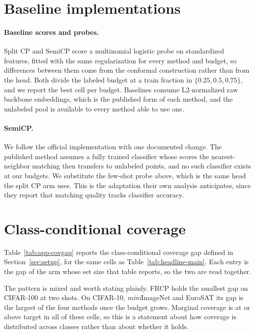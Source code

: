 \section{Baseline implementations}
\label{app:baselines}

\paragraph{Baseline scores and probes.} Split CP and SemiCP score a
multinomial logistic probe on standardized features, fitted with the
same regularization for every method and budget, so differences between
them come from the conformal construction rather than from the head.
Both divide the labeled budget at a train fraction in
$\{0.25, 0.5, 0.75\}$, and we report the best cell per budget.
Baselines consume L2-normalized raw backbone embeddings, which is the
published form of each method, and the unlabeled pool is available to
every method able to use one.

\paragraph{SemiCP.} We follow the official implementation with one
documented change. The published method assumes a fully trained
classifier whose scores the nearest-neighbor matching then transfers to
unlabeled points, and no such classifier exists at our budgets. We
substitute the few-shot probe above, which is the same head the split
CP arm uses. This is the adaptation their own analysis anticipates,
since they report that matching quality tracks classifier accuracy.

\section{Class-conditional coverage}
\label{app:covgap}

Table~\ref{tab:app-covgap} reports the class-conditional coverage gap
defined in Section~\ref{sec:setup}, for the same cells as
Table~\ref{tab:headline-main}. Each entry is the gap of the arm whose
set size that table reports, so the two are read together.

The pattern is mixed and worth stating plainly. FRCP holds the
smallest gap on CIFAR-100 at two shots. On CIFAR-10,
\emph{mini}ImageNet and EuroSAT its gap is the largest of the four
methods once the budget grows. Marginal coverage
is at or above target in all of these cells, so this is a statement
about how coverage is distributed across classes rather than about
whether it holds.


